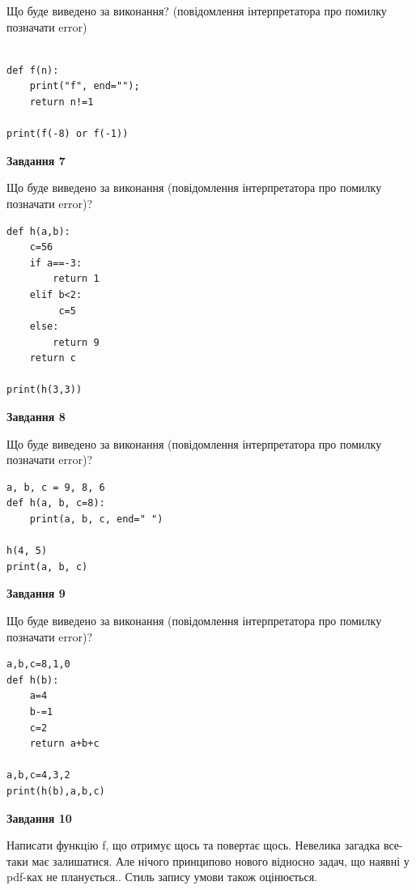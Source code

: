 \documentclass[12pt, ukrainian]{article}
\begin{document}
{\begin {large}
Що буде виведено за виконання? (повідомлення інтерпретатора про помилку позначати error)\par
\begin{verbatim}

def f(n):
    print("f", end="");
    return n!=1

print(f(-8) or f(-1))
\end{verbatim}

{\begin {center}\textbf{Завдання 7}\end {center}}

Що буде виведено за виконання (повідомлення інтерпретатора про помилку позначати error)?\par
\begin{verbatim}
def h(a,b):
    c=56
    if a==-3:
        return 1
    elif b<2:
         c=5
    else: 
        return 9
    return c

print(h(3,3))
\end{verbatim}

{\begin {center}\textbf{Завдання 8}\end {center}}

Що буде виведено за виконання (повідомлення інтерпретатора про помилку позначати error)?\par
\begin{verbatim}
a, b, c = 9, 8, 6
def h(a, b, c=8):
    print(a, b, c, end=" ")

h(4, 5)
print(a, b, c)
\end{verbatim}

{\begin {center}\textbf{Завдання 9}\end {center}}

Що буде виведено за виконання (повідомлення інтерпретатора про помилку позначати error)?\par
\begin{verbatim}
a,b,c=8,1,0
def h(b):
    a=4
    b-=1
    c=2
    return a+b+c

a,b,c=4,3,2
print(h(b),a,b,c)
\end{verbatim}

{\begin {center}\textbf{Завдання 10}\end {center}}


Написати функцiю f, що отримує щось та повертає щось. Невелика загадка все-таки має залишатися. Але нічого принципово нового відносно задач, що наявні у pdf-ках не планується.. Стиль запису умови також оцінюється.\par
\end {large}}
\newpage
\end{document}
